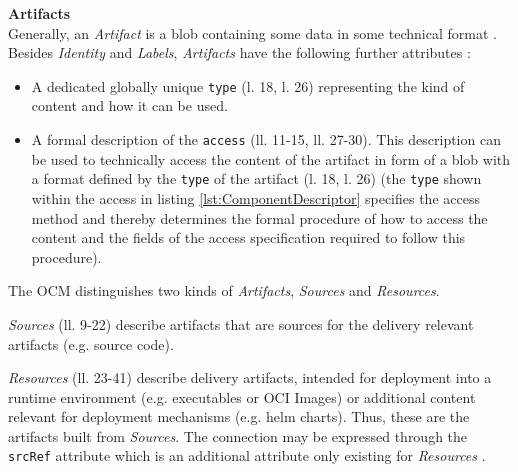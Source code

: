 \noindent\textbf{Artifacts}\\
Generally, an \emph{Artifact} is a blob containing some data in some technical format \cite{OCMSpec}. Besides \emph{Identity} and \emph{Labels}, \emph{Artifacts} have the following further attributes \cite{OCMSpec}:
\begin{itemize}
\item A dedicated globally unique \lstinline|type| (l. 18, l. 26) representing the kind of content and how it can be used.
\item A formal description of the \lstinline|access| (ll. 11-15, ll. 27-30). This description can be used to technically access the content of the artifact in form of a blob with a format defined by the \lstinline|type| of the artifact (l. 18, l. 26) (the \lstinline|type| shown within the access in listing \ref{lst:ComponentDescriptor} specifies the access method and thereby determines the formal procedure of how to access the content and the fields of the access specification required to follow this procedure).
\end{itemize}
The OCM distinguishes two kinds of \emph{Artifacts}, \emph{Sources} and \emph{Resources}.\par
\emph{Sources} (ll. 9-22) describe artifacts that are sources for the delivery relevant artifacts (e.g. source code).\par
\emph{Resources} (ll. 23-41) describe delivery artifacts, intended for deployment into a runtime environment (e.g. executables or OCI Images) or additional content relevant for deployment mechanisms (e.g. helm charts). Thus, these are the artifacts built from \emph{Sources}. The connection may be expressed through the \lstinline|srcRef| attribute which is an additional attribute only existing for \emph{Resources} \cite{OCMSpec}.\\

